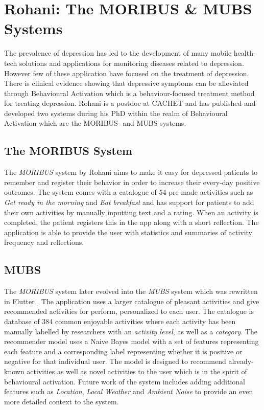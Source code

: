 \section{Rohani: The MORIBUS \& MUBS Systems}
The prevalence of depression has led to the development of many mobile health-tech solutions and applications for monitoring diseases related to depression. However few of these application have focused on the treatment of depression. There is clinical evidence showing that depressive symptoms can be alleviated through Behavioural Activation which is a behaviour-focused treatment method for treating depression. Rohani is a postdoc at CACHET and has published and developed two systems during his PhD within the realm of Behavioural Activation which are the MORIBUS- and MUBS systems.

\subsection{The MORIBUS System}
The \textit{MORIBUS} system \cite{moribus} by Rohani aims to make it easy for depressed patients to remember and register their behavior in order to increase their every-day positive outcomes. The system comes with a catalogue of 54 pre-made activities such as \textit{Get ready in the morning} and \textit{Eat breakfast} and has support for patients to add their own activities by manually inputting text and a rating. When an activity is completed, the patient registers this in the app along with a short reflection. The application   is able to provide the user with statistics and summaries of activity frequency and reflections.

\subsection{MUBS}
The \textit{MORIBUS} system later evolved into the \textit{MUBS} system which was rewritten in Flutter \cite{mubs-rohani}. The application uses a larger catalogue of pleasant activities and give recommended activities for perform, personalized to each user. The catalogue is database of 384 common enjoyable activities where each activity has been manually labelled by researchers with an \textit{activity level}, as well as a \textit{category}. The recommender model uses a Naive Bayes model with a set of features representing each feature and a corresponding label representing whether it is positive or negative for that individual user. The model is designed to recommend already-known activities as well as novel activities to the user which is in the spirit of behavioural activation. Future work of the system includes adding additional features such as \textit{Location}, \textit{Local Weather} and \textit{Ambient Noise} to provide an even more detailed context to the system.

